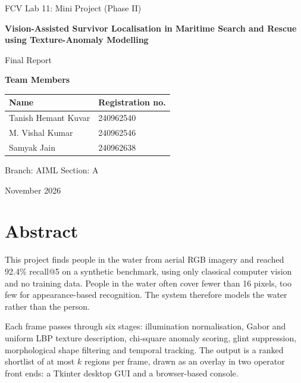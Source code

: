 \documentclass[11pt,a4paper]{article}
\begin{document}
\begin{titlepage}
\centering
\vspace*{3cm}
{\Large FCV Lab 11: Mini Project (Phase II)\par}
\vspace{1.5cm}
{\LARGE\bfseries Vision-Assisted Survivor Localisation in Maritime Search and Rescue using Texture-Anomaly Modelling\par}
\vspace{2cm}
{\large Final Report\par}
\vspace{2cm}
{\large\textbf{Team Members}\par}
\vspace{0.5cm}
\begin{tabular}{ll}
\toprule
Name & Registration no. \\
\midrule
Tanish Hemant Kuvar & 240962540 \\
M. Vishal Kumar & 240962546 \\
Samyak Jain & 240962638 \\
\bottomrule
\end{tabular}
\vspace{1cm}

{\large Branch: AIML \quad Section: A\par}
\vfill
{\large November 2026\par}
\end{titlepage}

\section*{Abstract}

This project finds people in the water from aerial RGB imagery and reached 92.4\% recall@5 on a synthetic benchmark, using only classical computer vision and no training data. People in the water often cover fewer than 16 pixels, too few for appearance-based recognition. The system therefore models the water rather than the person.

Each frame passes through six stages: illumination normalisation, Gabor and uniform LBP texture description, chi-square anomaly scoring, glint suppression, morphological shape filtering and temporal tracking. The output is a ranked shortlist of at most $k$ regions per frame, drawn as an overlay in two operator front ends: a Tkinter desktop GUI and a browser-based console.
\end{document}
